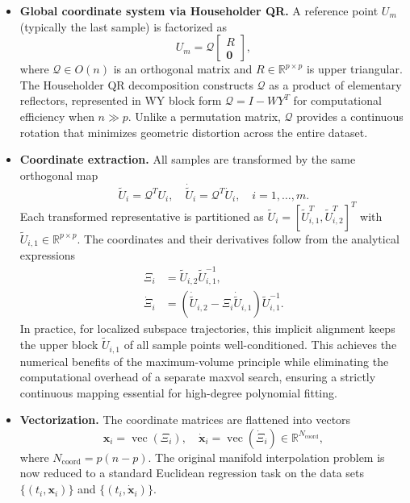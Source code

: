 \documentclass[11pt]{article}
\begin{document}
\begin{itemize}
    \item \textbf{Global coordinate system via Householder QR.} A reference point $U_m$ (typically the last sample) is factorized as
 $$
        U_m = \mathcal{Q} \begin{bmatrix} R \\ \mathbf{0} \end{bmatrix},
 $$
    where $\mathcal{Q} \in O(n)$ is an orthogonal matrix and $R \in \mathbb{R}^{p \times p}$ is upper triangular. The Householder QR decomposition constructs $\mathcal{Q}$ as a product of elementary reflectors, represented in WY block form $\mathcal{Q} = I - WY^T$ for computational efficiency when $n \gg p$. Unlike a permutation matrix, $\mathcal{Q}$ provides a continuous rotation that minimizes geometric distortion across the entire dataset.

    \item \textbf{Coordinate extraction.} All samples are transformed by the same orthogonal map
 $$
        \tilde{U}_i = \mathcal{Q}^T U_i, \quad \dot{\tilde{U}}_i = \mathcal{Q}^T \dot{U}_i, \quad i = 1, \ldots, m.
 $$
    Each transformed representative is partitioned as $\tilde{U}_i = [\tilde{U}_{i,1}^T, \tilde{U}_{i,2}^T]^T$ with $\tilde{U}_{i,1} \in \mathbb{R}^{p \times p}$. The coordinates and their derivatives follow from the analytical expressions
\begin{align*}
    \Xi_i &= \tilde{U}_{i,2} \tilde{U}_{i,1}^{-1}, \\
    \dot{\Xi}_i &= (\dot{\tilde{U}}_{i,2} - \Xi_i \dot{\tilde{U}}_{i,1}) \tilde{U}_{i,1}^{-1}.
\end{align*}
    In practice, for localized subspace trajectories, this implicit alignment keeps the upper block $\tilde{U}_{i,1}$ of all sample points well-conditioned. This achieves the numerical benefits of the maximum-volume principle while eliminating the computational overhead of a separate maxvol search, ensuring a strictly continuous mapping essential for high-degree polynomial fitting.

    \item \textbf{Vectorization.} The coordinate matrices are flattened into vectors
    $$
        \mathbf{x}_i = \operatorname{vec}(\Xi_i), \quad \dot{\mathbf{x}}_i = \operatorname{vec}(\dot{\Xi}_i) \in \mathbb{R}^{N_{\text{coord}}},
  $$
    where $N_{\text{coord}} = p(n-p)$. The original manifold interpolation problem is now reduced to a standard Euclidean regression task on the data sets $\{(t_i,\mathbf{x}_i)\}$ and $\{(t_i,\dot{\mathbf{x}}_i)\}$.
\end{itemize}
\end{document}
